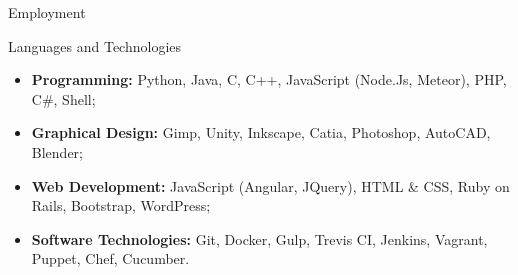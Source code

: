 \documentclass[]{fraguilarcv}
\begin{document}
\begin{cvsection}{Employment}
	\begin{cvsection}{Languages and Technologies}
		\begin{cvsubsection}{}{}{}
			\begin{itemize}
				\item \textbf {Programming:} Python, Java, C, C++, JavaScript (Node.Js, Meteor), PHP, C\#, Shell;
				\item \textbf {Graphical Design:} Gimp, Unity, Inkscape, Catia, Photoshop, AutoCAD, Blender;
                \item \textbf{Web Development:} JavaScript (Angular, JQuery), HTML \& CSS, Ruby on Rails, Bootstrap, WordPress; 
                \item \textbf{Software Technologies:} Git, Docker, Gulp, Trevis CI, Jenkins, Vagrant, Puppet, Chef, Cucumber.
			\end{itemize}
		\end{cvsubsection}
	\end{cvsection}
\end{cvsection}
\end{document}
